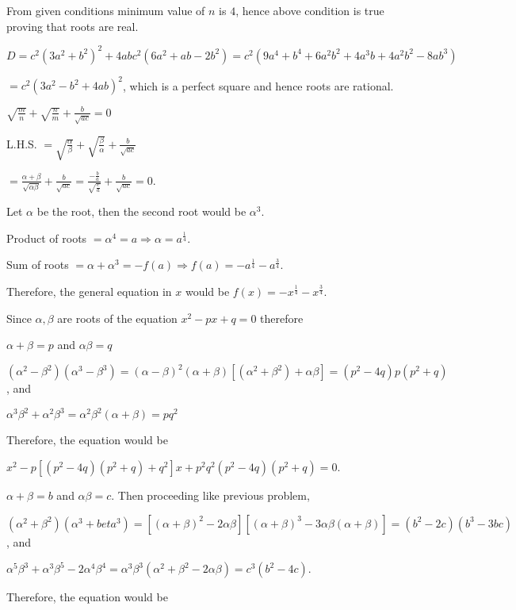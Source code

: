   From given conditions minimum value of $n$ is $4$, hence above condition is true proving that roots are
  real.
\item $D = c^2(3a^2 + b^2)^2 + 4abc^2(6a^2 + ab - 2b^2) = c^2(9a^4 + b^4 + 6a^2b^2 + 4a^3b + 4a^2b^2 - 8ab^3)$

  $= c^2(3a^2 - b^2 + 4ab)^2$, which is a perfect square and hence roots are rational.
\item $\sqrt{\frac{m}{n}} + \sqrt{\frac{n}{m}} + \frac{b}{\sqrt{ac}} = 0$

  L.H.S. $= \sqrt{\frac{\alpha}{\beta}} + \sqrt{\frac{\beta}{\alpha}} + \frac{b}{\sqrt{ac}}$

  $= \frac{\alpha + \beta}{\sqrt{\alpha\beta}} + \frac{b}{\sqrt{ac}} =
  \frac{-\frac{b}{a}}{\sqrt{\frac{c}{a}}} + \frac{b}{\sqrt{ac}} = 0$.
\item Let $\alpha$ be the root, then the second root would be $\alpha^3$.

  Product of roots $= \alpha^4 = a \Rightarrow \alpha = a^{\frac{1}{4}}$.

  Sum of roots $= \alpha + \alpha^3 = -f(a)\Rightarrow f(a) = -a^{\frac{1}{4}} - a^{\frac{3}{4}}$.

  Therefore, the general equation in $x$ would be $f(x) = -x^{\frac{1}{4}} - x^{\frac{3}{4}}$.
\item Since $\alpha, \beta$ are roots of the equation $x^2 - px + q = 0$ therefore

  $\alpha + \beta = p$ and $\alpha\beta = q$

  $(\alpha^2 - \beta^2)(\alpha^3 - \beta^3) = (\alpha - \beta)^2(\alpha + \beta)[(\alpha^2 + \beta^2) +
  \alpha\beta] =(p^2 - 4q)p(p^2 + q)$, and

  $\alpha^3\beta^2 + \alpha^2\beta^3 = \alpha^2\beta^2(\alpha + \beta) = pq^2$

  Therefore, the equation would be

  $x^2 - p[(p^2 - 4q)(p^2 + q) + q^2]x + p^2q^2(p^2 - 4q)(p^2 + q) = 0$.
\item $\alpha + \beta = b$ and $\alpha\beta = c$. Then proceeding like previous problem,

  $(\alpha^2 + \beta^2)(\alpha^3 + beta^3) = [(\alpha + \beta)^2 - 2\alpha\beta][(\alpha + \beta)^3 -
  3\alpha\beta(\alpha + \beta)] = (b^2 - 2c)(b^3 - 3bc)$, and

  $\alpha^5\beta^3 + \alpha^3\beta^5 - 2\alpha^4\beta^4 = \alpha^3\beta^3(\alpha^2 + \beta^2 - 2\alpha\beta)
  = c^3(b^2 - 4c)$.

  Therefore, the equation would be

